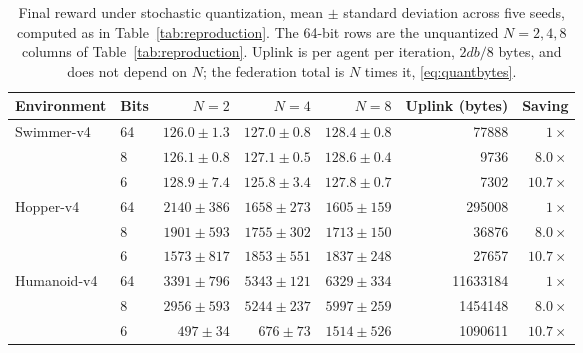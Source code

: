 \begin{table}[t]
  \centering
  \caption{Final reward under stochastic quantization, mean $\pm$ standard
  deviation across five seeds, computed as in Table~\ref{tab:reproduction}. The
  64-bit rows are the unquantized $N = 2, 4, 8$ columns of
  Table~\ref{tab:reproduction}. Uplink is per agent per iteration, $2db/8$
  bytes, and does not depend on $N$; the federation total is $N$ times it,
  \eqref{eq:quantbytes}.}
  \label{tab:quant}
  \begin{tabular}{llrrrrr}
    \toprule
    Environment & Bits & $N=2$ & $N=4$ & $N=8$ & Uplink (bytes) & Saving \\
    \midrule
    \multirow{3}{*}{Swimmer-v4}
      & 64 & $126.0 \pm 1.3$ & $127.0 \pm 0.8$ & $128.4 \pm 0.8$ & \num{77888} & $1\times$ \\
      & 8  & $126.1 \pm 0.8$ & $127.1 \pm 0.5$ & $128.6 \pm 0.4$ & \num{9736}  & $\mathbf{8.0\times}$ \\
      & 6  & $128.9 \pm 7.4$ & $125.8 \pm 3.4$ & $127.8 \pm 0.7$ & \num{7302}  & $\mathbf{10.7\times}$ \\
    \midrule
    \multirow{3}{*}{Hopper-v4}
      & 64 & $2140 \pm 386$ & $1658 \pm 273$ & $1605 \pm 159$ & \num{295008} & $1\times$ \\
      & 8  & $1901 \pm 593$ & $1755 \pm 302$ & $1713 \pm 150$ & \num{36876}  & $\mathbf{8.0\times}$ \\
      & 6  & $1573 \pm 817$ & $1853 \pm 551$ & $1837 \pm 248$ & \num{27657}  & $\mathbf{10.7\times}$ \\
    \midrule
    \multirow{3}{*}{Humanoid-v4}
      & 64 & $3391 \pm 796$ & $5343 \pm 121$ & $6329 \pm 334$ & \num{11633184} & $1\times$ \\
      & 8  & $2956 \pm 593$ & $5244 \pm 237$ & $5997 \pm 259$ & \num{1454148}  & $\mathbf{8.0\times}$ \\
      & 6  & $497 \pm 34$   & $676 \pm 73$   & $1514 \pm 526$ & \num{1090611}  & $10.7\times$ \\
    \bottomrule
  \end{tabular}
\end{table}

